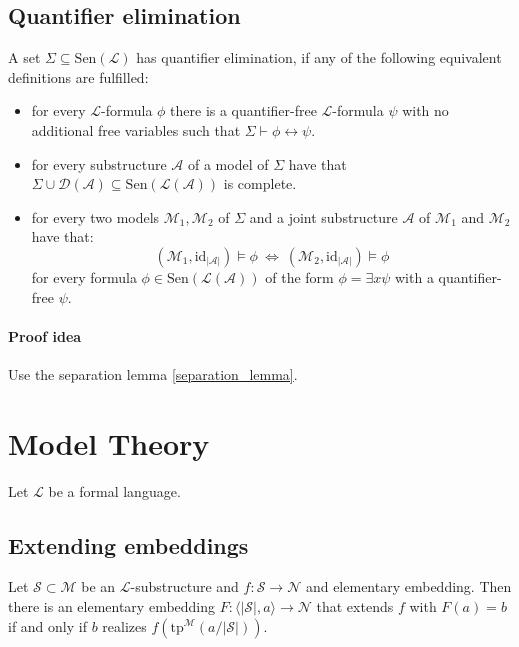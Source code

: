 \documentclass{scrartcl}
\begin{document}
\subsection{Quantifier elimination}
A set $\Sigma \subseteq \mathrm{Sen}(\mathcal{L})$ has quantifier elimination, if any of the following equivalent definitions are fulfilled:
\begin{itemize}
    \item for every $\mathcal{L}$-formula $\phi$ there is a quantifier-free $\mathcal{L}$-formula $\psi$ with no additional free variables such that $\Sigma \vdash \phi \leftrightarrow \psi$.
    \item for every substructure $\mathcal{A}$ of a model of $\Sigma$ have that $\Sigma \cup \mathcal{D}(\mathcal{A}) \subseteq \mathrm{Sen}(\mathcal{L}(\mathcal{A}))$ is complete.
    \item for every two models $\mathcal{M}_1, \mathcal{M}_2$ of $\Sigma$ and a joint substructure $\mathcal{A}$ of $\mathcal{M}_1$ and $\mathcal{M}_2$ have that:
    \begin{equation*}
        (\mathcal{M}_1, \mathrm{id}_{|\mathcal{A}|}) \models \phi \ \Leftrightarrow \ (\mathcal{M}_2, \mathrm{id}_{|\mathcal{A}|}) \models \phi
    \end{equation*}
    for every formula $\phi \in \mathrm{Sen}(\mathcal{L}(\mathcal{A}))$ of the form $\phi = \exists x \psi$ with a quantifier-free $\psi$.
\end{itemize}
\paragraph{Proof idea} Use the separation lemma \ref{separation_lemma}.

\section{Model Theory}

Let $\mathcal{L}$ be a formal language.

\subsection{Extending embeddings}
Let $\mathcal{S} \subset \mathcal{M}$ be an $\mathcal{L}$-substructure and $f: \mathcal{S} \to \mathcal{N}$ and elementary embedding.
Then there is an elementary embedding $F: \langle |\mathcal{S}|, a \rangle \to \mathcal{N}$ that extends $f$ with $F(a) = b$ if and only if $b$ realizes $f(\mathrm{tp}^{\mathcal{M}}(a/|\mathcal{S}|))$.
\end{document}
